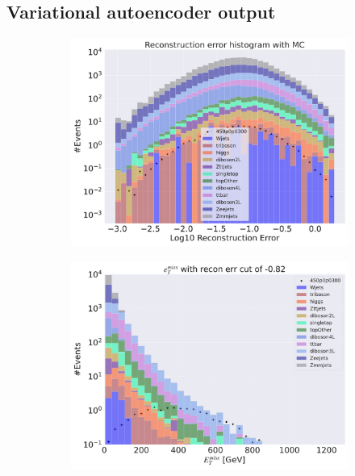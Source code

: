 \subsection*{Variational autoencoder output}

\begin{figure}[H]
    \centering
    \begin{subfigure}{.40\textwidth}
        \includegraphics[width=\textwidth]{Figures/VAE_testing/big/3lep/b_data_recon_big_rm3_feats_sig_450p0p0300.pdf}
        \caption{ }
        \label{fig:VAE_3lep_big_450_2}
    \end{subfigure}
    \hfill
    \begin{subfigure}{.40\textwidth}
        \includegraphics[width=\textwidth]{Figures/VAE_testing/big/3lep/b_data_recon_big_rm3_feats_sig_450p0p0300_etmiss_recon_errcut_-0.82.pdf}

\end{subfigure}
\end{figure}

